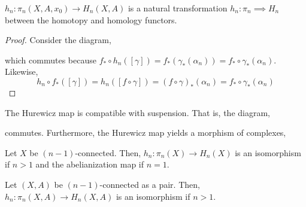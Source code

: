 \documentclass[12pt]{extarticle}
\begin{document}
\begin{lemma}
$h_n : \pi_n(X, A, x_0) \to H_n(X, A)$ is a natural transformation $h_n : \pi_n \implies H_n$  between the homotopy and homology functors. 
\end{lemma}

\begin{proof}
Consider the diagram,
\begin{center}
\end{center}
which commutes because $f_* \circ h_n([\gamma]) = f_*(\gamma_*(\alpha_n)) = f_* \circ \gamma_*(\alpha_n)$. Likewise, \[h_n \circ f_*([\gamma]) = h_n([f \circ \gamma]) = (f \circ \gamma)_*(\alpha_n) = f_* \circ \gamma_*(\alpha_n)\]
\end{proof}

\begin{lemma}
The Hurewicz map is compatible with suspension. That is, the diagram,
\begin{center}
\end{center}
commutes. Furthermore, the Hurewicz map yields a morphism of complexes,
\begin{center}
\end{center}
\end{lemma}

\begin{theorem}[Hurewicz]
Let $X$ be $(n-1)$-connected. Then, $h_n : \pi_n(X) \to H_n(X)$ is an isomorphism if $n > 1$ and the abelianization map if $n = 1$. 
\end{theorem}

\begin{theorem}
Let $(X, A)$ be $(n-1)$-connected as a pair. Then, $h_n : \pi_n(X, A) \to H_n(X, A)$ is an isomorphism if $n > 1$. 
\end{theorem}
\end{document}
